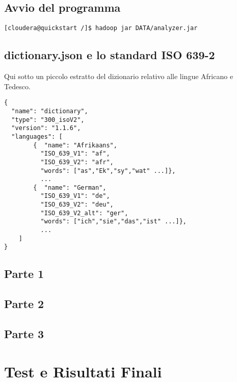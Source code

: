 \documentclass{article}
\begin{document}
\subsection{Avvio del programma}
\begin{verbatim}
[cloudera@quickstart /]$ hadoop jar DATA/analyzer.jar
\end{verbatim}

\subsection{dictionary.json e lo standard ISO 639-2}
Qui sotto un piccolo estratto del dizionario relativo alle lingue Africano e Tedesco.
\begin{verbatim}
{
  "name": "dictionary",
  "type": "300_isoV2",
  "version": "1.1.6",
  "languages": [
        {  "name": "Afrikaans",
          "ISO_639_V1": "af",
          "ISO_639_V2": "afr",
          "words": ["as","Ek","sy","wat" ...]}, 
          ...
        {  "name": "German",
          "ISO_639_V1": "de",
          "ISO_639_V2": "deu",
          "ISO_639_V2_alt": "ger",
          "words": ["ich","sie","das","ist" ...]}, 
          ...
    ]
}
\end{verbatim}

\subsection{Parte 1}
\subsection{Parte 2}
\subsection{Parte 3}

\section{Test e Risultati Finali}
\end{document}
